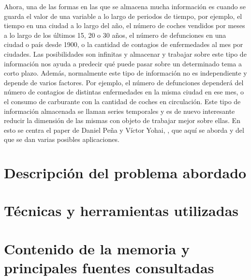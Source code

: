 Ahora, una de las formas en las que se almacena mucha información es cuando se guarda el valor de una variable a lo largo de periodos de tiempo, por ejemplo, el tiempo en una ciudad a lo largo del año, el número de coches vendidos por meses a lo largo de los últimos 15, 20 o 30 años, el número de defunciones en una ciudad o país desde 1900, o la cantidad de contagios de enfermedades al mes por ciudades. Las posibilidades son infinitas y almacenar y trabajar sobre este tipo de información nos ayuda a predecir qué puede pasar sobre un determinado tema a corto plazo. Además, normalmente este tipo de información no es independiente y depende de varios factores. Por ejemplo, el número de defunciones dependerá del número de contagios de distintas enfermedades en la misma ciudad en ese mes, o el consumo de carburante con la cantidad de coches en circulación. Este tipo de información almacenada se llaman series temporales y es de nuevo interesante reducir la dimensión de las mismas con objeto de trabajar mejor sobre ellas. En esto se centra el paper de Daniel Peña y Víctor Yohai, \cite{pena16}, que aquí se aborda y del que se dan varias posibles aplicaciones.


\section{Descripción del problema abordado}



\section{Técnicas y herramientas utilizadas}


\section{Contenido de la memoria y principales fuentes consultadas}



%